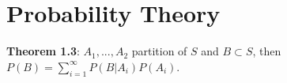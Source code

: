 \section{Probability Theory}
\textbf{Theorem 1.3}: $A_1, ..., A_2$ partition of $S$ and $B\subset S$, then $P(B) = \sum_{i=1}^\infty P(B|A_i)P(A_i)$.